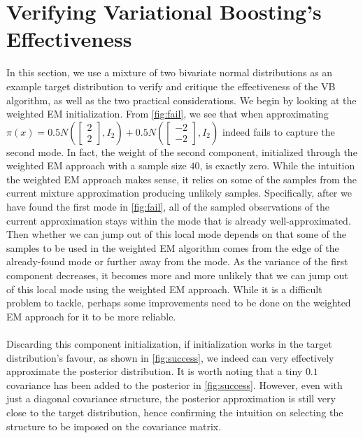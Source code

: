 

\section{Verifying Variational Boosting's Effectiveness} \label{sec:verify}
In this section, we use a mixture of two bivariate normal distributions as an example target distribution to verify and critique the effectiveness of the VB algorithm, as well as the two practical considerations. We begin by looking at the weighted EM initialization. From \cref{fig:fail}, we see that when approximating $\pi(x) = 0.5 N\left(\begin{bmatrix} 2\\2 \end{bmatrix}, I_2\right) + 0.5N\left(\begin{bmatrix} -2\\-2 \end{bmatrix}, I_2\right)$ indeed fails to capture the second mode. In fact, the weight of the second component, initialized through the weighted EM approach with a sample size $40$, is exactly zero. While the intuition the weighted EM approach makes sense, it relies on some of the samples from the current mixture approximation producing unlikely samples. Specifically, after we have found the first mode in \cref{fig:fail}, all of the sampled observations of the current approximation stays within the mode that is already well-approximated. Then whether we can jump out of this local mode depends on that some of the samples to be used in the weighted EM algorithm comes from the edge of the already-found mode or further away from the mode. As the variance of the first component decreases, it becomes more and more unlikely that we can jump out of this local mode using the weighted EM approach. While it is a difficult problem to tackle, perhaps some improvements need to be done on the weighted EM approach for it to be more reliable.\\\\
Discarding this component initialization, if initialization works in the target distribution's favour, as shown in \cref{fig:success}, we indeed can very effectively approximate the posterior distribution. It is worth noting that a tiny $0.1$ covariance has been added to the posterior in \cref{fig:success}. However, even with just a diagonal covariance structure, the posterior approximation is still very close to the target distribution, hence confirming the intuition on selecting the structure to be imposed on the covariance matrix.

